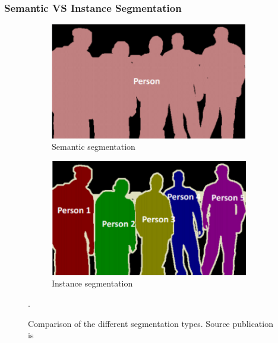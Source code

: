 \documentclass{beamer}
\begin{document}
\begin{frame}
    \frametitle{Semantic VS Instance Segmentation}

    \begin{figure}[h]
        \begin{subfigure}{0.5\textwidth}
            \centering
            \includegraphics[width=0.95\textwidth]{semantic_segm_example.png}
            \caption{Semantic segmentation}
        \end{subfigure}
        \begin{subfigure}{0.49\textwidth}
            \centering
            \includegraphics[width=0.95\textwidth]{instance_segm_example.png}
            \caption{Instance segmentation}
        \end{subfigure}
        \caption{Comparison of the different segmentation types. Source publication is \cite{segm_type_comp}}.
    \end{figure}

\end{frame}
\end{document}
